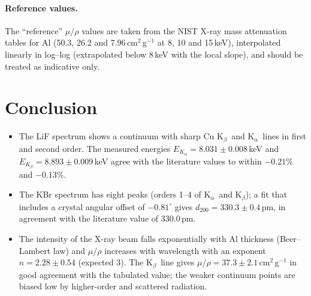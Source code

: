 \documentclass[11pt,a4paper]{article}
\newcommand{\Ka}{K$_\alpha$}
\newcommand{\Kb}{K$_\beta$}
\begin{document}
\paragraph{Reference values.} The ``reference'' $\mu/\rho$ values are taken from the NIST X-ray mass attenuation tables for Al (50.3, 26.2 and 7.96\,cm$^2$\,g$^{-1}$ at 8, 10 and 15\,keV), interpolated linearly in log--log (extrapolated below 8\,keV with the local slope), and should be treated as indicative only.



\section{Conclusion}
\begin{itemize}[nosep]
\item The LiF spectrum shows a continuum with sharp Cu \Kb\ and \Ka\ lines in first and second order. The measured energies $E_{K_\alpha}=8.031\pm0.008$\,keV and $E_{K_\beta}=8.893\pm0.009$\,keV agree with the literature values to within $-0.21\%$ and $-0.13\%$.
\item The KBr spectrum has eight peaks (orders 1--4 of \Ka\ and \Kb); a fit that includes a crystal angular offset of $-0.81^\circ$ gives $d_{200}=330.3\pm0.4$\,pm, in agreement with the literature value of $330.0$\,pm.
\item The intensity of the X-ray beam falls exponentially with Al thickness (Beer--Lambert law) and $\mu/\rho$ increases with wavelength with an exponent $n=2.28\pm0.54$ (expected 3). The \Kb\ line gives $\mu/\rho=37.3\pm2.1$\,cm$^2$\,g$^{-1}$ in good agreement with the tabulated value; the weaker continuum points are biased low by higher-order and scattered radiation.
\end{itemize}
\end{document}
